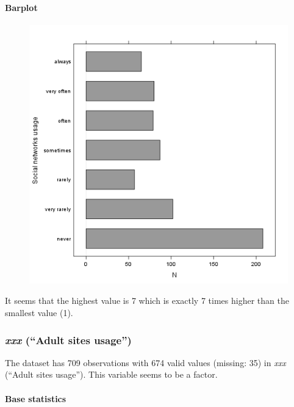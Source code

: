 \documentclass{article}
\makeatletter
\def\maxwidth{\ifdim\Gin@nat@width>\linewidth\linewidth
\else\Gin@nat@width\fi}
\let\Oldincludegraphics\includegraphics
\renewcommand{\includegraphics}[1]{\Oldincludegraphics[width=\maxwidth]{#1}}
\makeatother
\begin{document}
\paragraph{Barplot}

\begin{figure}[htbp]
\centering
\includegraphics{8475d98870c1cdd2436a3abdb0d69a66.png}
\caption{}
\end{figure}

It seems that the highest value is 7 which is exactly 7 times higher
than the smallest value (1).

\subsubsection{\emph{xxx} (``Adult sites usage'')}

The dataset has 709 observations with 674 valid values (missing: 35) in
\emph{xxx} (``Adult sites usage''). This variable seems to be a factor.

\paragraph{Base statistics}
\end{document}
